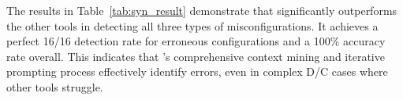 The results in Table~\ref{tab:syn_result} demonstrate that \sysname{} significantly outperforms the other tools in detecting all three types of misconfigurations. It achieves a perfect 16/16 detection rate for erroneous configurations and a 100\% accuracy rate overall. This indicates that \sysname{}'s comprehensive context mining and iterative prompting process effectively identify errors, even in complex D/C cases where other tools struggle.

\begin{table}[t]
\centering
{}
\caption{Ablation study results on the Campus B dataset, comparing the standard iterative \sysname{} framework against a version that provides all context by default.}
\label{tab:ablation_results}
\end{table}

